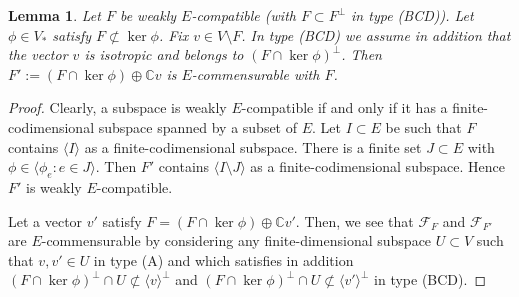 \documentclass[12pt]{amsart}
\newcommand{\C}{\mathbb{C}}
\newcommand{\Ff}{\mathcal{F}}
\renewcommand{\span}[1]{\langle #1\rangle}
\numberwithin{equation}{section}
\newtheorem{lemma}[theorem]{Lemma}
\theoremstyle{definition}
\begin{document}
\begin{lemma}
\label{L4-T1}
Let $F$ be weakly $E$-compatible (with $F\subset F^\perp$ in type (BCD)). Let $\phi\in V_*$ satisfy $F\not\subset\ker \phi$. Fix $v\in V\setminus F$. 
In type (BCD) we assume in addition that the vector $v$ is isotropic and belongs to $(F\cap\ker\phi)^\perp$.
Then $F':=(F\cap \ker\phi)\oplus\C v$ is $E$-commensurable with $F$.
\end{lemma} 

\begin{proof}
Clearly, a subspace 
is weakly $E$-compatible if and only if it has a finite-codimensional subspace spanned by a subset of $E$. 
Let $I\subset E$ be such that $F$ contains $\span{I}$ as a finite-codimensional subspace.
There is a finite set $J\subset E$ with $\phi\in\span{\phi_e:e\in J}$. Then $F'$ contains $\span{I\setminus J}$ as a finite-codimensional subspace. Hence $F'$ is weakly $E$-compatible.

Let a vector $v'$ satisfy $F=(F\cap \ker \phi)\oplus\mathbb{C}v'$. 
%
Then, we see that $\Ff_F$ and $\Ff_{F'}$ are $E$-commensurable by considering
any finite-dimensional subspace $U\subset V$ such that $v,v'\in U$ in type (A) and which satisfies in addition
$(F\cap\ker\phi)^\perp\cap U\not\subset\span{v}^\perp$
and $(F\cap\ker\phi)^\perp\cap U\not\subset\span{v'}^\perp$ in type (BCD).
\end{proof}
\end{document}
